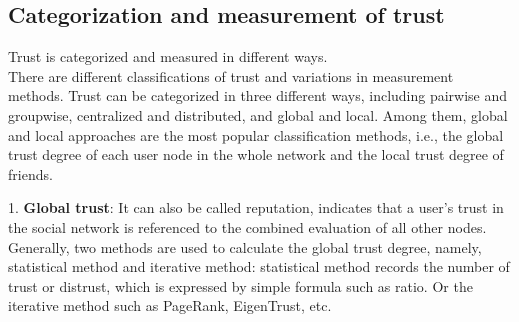 \subsection{Categorization and measurement of trust}
Trust is categorized and measured in different ways.
\\
There are different classifications of trust and variations in measurement methods\cite{b28, b29}. 
Trust can be categorized in three different ways, including pairwise and groupwise, 
centralized and distributed, and global and local. Among them, global and local approaches 
are the most popular classification methods, i.e., the global trust degree of each user 
node in the whole network and the local trust degree of friends.

1.
\textbf{Global trust}:
It can also be called reputation, indicates that a user's trust in the social network is referenced 
to the combined evaluation of all other nodes\cite{b22}. Generally, two methods are used 
to calculate the global trust degree, namely, statistical method and iterative method: 
statistical method records the number of trust or distrust, which is expressed by simple 
formula such as ratio. Or the iterative method such as PageRank, EigenTrust, etc\cite{b15}.

